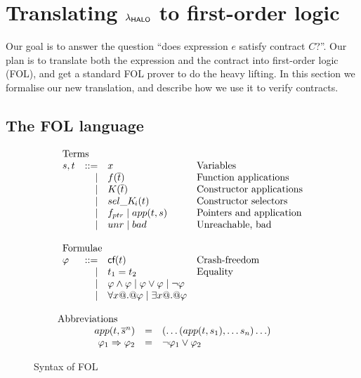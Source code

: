 \section{Translating $\lambda_{\sf HALO}$ to first-order logic} \label{ssect:trans-fol}

Our goal is to answer the question ``does expression $e$ satisfy
contract $C$?''.  Our plan is to translate both the expression and the
contract into first-order logic (FOL), and get a standard FOL prover
to do the heavy lifting.
In this section we formalise our new translation, and describe how we use it to
verify contracts.

\subsection{The FOL language}

\begin{figure}
\[\begin{array}{c}
\begin{array}{lrll}
\multicolumn{3}{l}{\text{Terms}} \\
  s,t & ::=  & x                          & \text{Variables} \\
      & \mid & f(\ol{t})                  & \text{Function applications} \\
      & \mid & K(\ol{t})                  & \text{Constructor applications} \\
      & \mid & \sel{K}{i}(t)              & \text{Constructor selectors} \\
      & \mid & f_{ptr} \mid app(t,s)       & \text{Pointers and application} \\
      & \mid & \unr \mid \bad             & \text{Unreachable, bad} \\ \\
\multicolumn{3}{l}{\text{Formulae}} \\
 \phi & ::=  & \lcf{t}    & \text{Crash-freedom} \\
      & \mid & t_1 = t_2  & \text{Equality} \\
      & \mid & \phi \land \phi \mid \phi \lor \phi \mid \neg \phi \\
      & \mid & \forall x @.@ \phi \mid \exists x @.@ \phi \\ \\
\end{array}
\\
\multicolumn{1}{l}{\text{Abbreviations}} \\
\begin{array}{rcl}
app(t,\oln{s}{n}) & = & (\ldots(app(t,s_1),\ldots s_n)\ldots) \\
\phi_1 \Rightarrow \phi_2 & = & \neg \phi_1 \lor \phi_2
\end{array}
\end{array}\]
\caption{Syntax of FOL}\label{fig:fol-image}
\end{figure}


